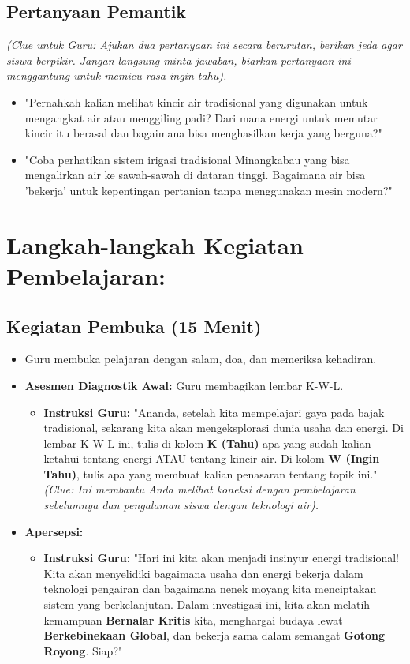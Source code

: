 \documentclass[12pt,a4paper]{article}
\begin{document}
\subsection{Pertanyaan Pemantik}
\textit{(Clue untuk Guru: Ajukan dua pertanyaan ini secara berurutan, berikan jeda agar siswa berpikir. Jangan langsung minta jawaban, biarkan pertanyaan ini menggantung untuk memicu rasa ingin tahu).}

\begin{itemize}
\item "Pernahkah kalian melihat kincir air tradisional yang digunakan untuk mengangkat air atau menggiling padi? Dari mana energi untuk memutar kincir itu berasal dan bagaimana bisa menghasilkan kerja yang berguna?"
\item "Coba perhatikan sistem irigasi tradisional Minangkabau yang bisa mengalirkan air ke sawah-sawah di dataran tinggi. Bagaimana air bisa 'bekerja' untuk kepentingan pertanian tanpa menggunakan mesin modern?"
\end{itemize}

\section{Langkah-langkah Kegiatan Pembelajaran:}

\subsection{Kegiatan Pembuka (15 Menit)}
\begin{itemize}
\item Guru membuka pelajaran dengan salam, doa, dan memeriksa kehadiran.
\item \textbf{Asesmen Diagnostik Awal:} Guru membagikan lembar K-W-L.
    \begin{itemize}
    \item \textbf{Instruksi Guru:} "Ananda, setelah kita mempelajari gaya pada bajak tradisional, sekarang kita akan mengeksplorasi dunia usaha dan energi. Di lembar K-W-L ini, tulis di kolom \textbf{K (Tahu)} apa yang sudah kalian ketahui tentang energi ATAU tentang kincir air. Di kolom \textbf{W (Ingin Tahu)}, tulis apa yang membuat kalian penasaran tentang topik ini." \textit{(Clue: Ini membantu Anda melihat koneksi dengan pembelajaran sebelumnya dan pengalaman siswa dengan teknologi air).}
    \end{itemize}
\item \textbf{Apersepsi:}
    \begin{itemize}
    \item \textbf{Instruksi Guru:} "Hari ini kita akan menjadi insinyur energi tradisional! Kita akan menyelidiki bagaimana usaha dan energi bekerja dalam teknologi pengairan dan bagaimana nenek moyang kita menciptakan sistem yang berkelanjutan. Dalam investigasi ini, kita akan melatih kemampuan \textbf{Bernalar Kritis} kita, menghargai budaya lewat \textbf{Berkebinekaan Global}, dan bekerja sama dalam semangat \textbf{Gotong Royong}. Siap?"
    \end{itemize}
\end{itemize}
\end{document}
